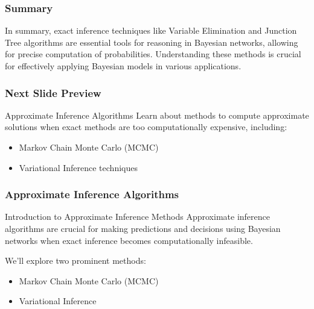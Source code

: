 \documentclass[aspectratio=169]{beamer}
\begin{document}
\begin{frame}[fragile]
    \frametitle{Summary}
    In summary, exact inference techniques like Variable Elimination and Junction Tree algorithms are essential tools for reasoning in Bayesian networks, allowing for precise computation of probabilities. Understanding these methods is crucial for effectively applying Bayesian models in various applications.
\end{frame}

\begin{frame}[fragile]
    \frametitle{Next Slide Preview}
    \begin{block}{Approximate Inference Algorithms}
        Learn about methods to compute approximate solutions when exact methods are too computationally expensive, including:
        \begin{itemize}
            \item Markov Chain Monte Carlo (MCMC)
            \item Variational Inference techniques
        \end{itemize}
    \end{block}
\end{frame}

\begin{frame}[fragile]
    \frametitle{Approximate Inference Algorithms}
    
    \begin{block}{Introduction to Approximate Inference Methods}
        Approximate inference algorithms are crucial for making predictions and decisions using Bayesian networks when exact inference becomes computationally infeasible.
        
        We'll explore two prominent methods:
        \begin{itemize}
            \item Markov Chain Monte Carlo (MCMC)
            \item Variational Inference
        \end{itemize}
    \end{block}
\end{frame}
\end{document}
